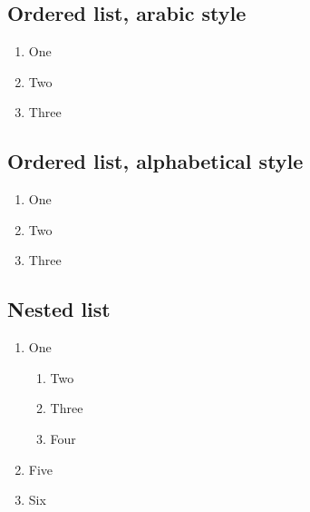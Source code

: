 \documentclass{article}
\begin{document}
    \subsection{Ordered list, arabic style}

    \begin{enumerate}[label=(\arabic*)]
        \item One
        \item Two
        \item Three
    \end{enumerate}

    \subsection{Ordered list, alphabetical style}

    \begin{enumerate}[label=(\alph*)]
        \item One
        \item Two
        \item Three
    \end{enumerate}


    \subsection{Nested list}

    \begin{enumerate}
        \item One
            \begin{enumerate}
                \item Two
                \item Three
                \item Four
            \end{enumerate}
        \item Five
        \item Six
    \end{enumerate}

    \newpage
    
    \begin{appendix}
	\listoffigures
	\listoftables
    \end{appendix}
\end{document}
